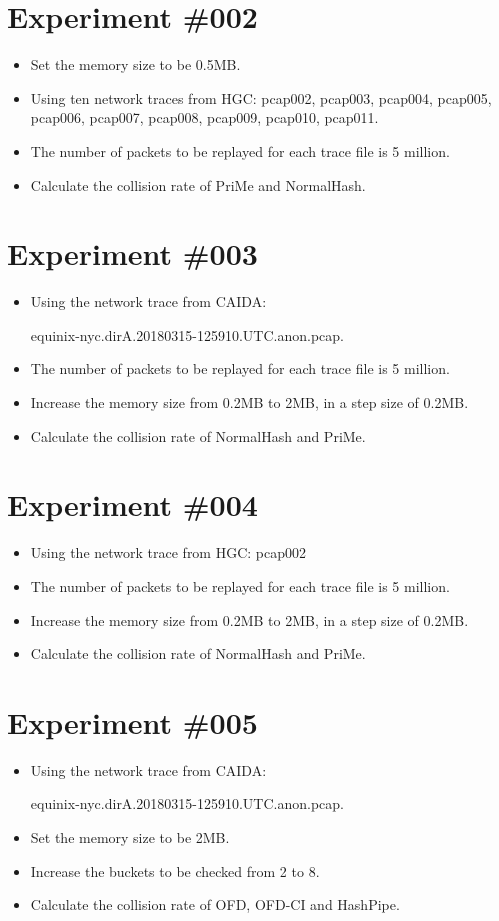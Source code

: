 \documentclass[10pt, conference, letterpaper]{IEEEtran}
\begin{document}
\section*{Experiment \#002}
\begin{itemize}
	\item Set the memory size to be 0.5MB.
	\item Using ten network traces from HGC: pcap002, pcap003, pcap004, pcap005, pcap006, pcap007, pcap008, pcap009, pcap010, pcap011.
	\item The number of packets to be replayed for each trace file is 5 million.
	\item Calculate the collision rate of PriMe and NormalHash.
\end{itemize}

\section*{Experiment \#003}
\begin{itemize}
	\item Using the network trace from CAIDA:

equinix-nyc.dirA.20180315-125910.UTC.anon.pcap.
	\item The number of packets to be replayed for each trace file is 5 million.
	\item Increase the memory size from 0.2MB to 2MB, in a step size of 0.2MB.
	\item Calculate the collision rate of NormalHash and PriMe.
\end{itemize}

\section*{Experiment \#004}
\begin{itemize}
	\item Using the network trace from HGC: pcap002
	\item The number of packets to be replayed for each trace file is 5 million.
	\item Increase the memory size from 0.2MB to 2MB, in a step size of 0.2MB.
	\item Calculate the collision rate of NormalHash and PriMe.
\end{itemize}

\section*{Experiment \#005}
\begin{itemize}
	\item Using the network trace from CAIDA:

equinix-nyc.dirA.20180315-125910.UTC.anon.pcap.
	\item Set the memory size to be 2MB.
	\item Increase the buckets to be checked from 2 to 8.
	\item Calculate the collision rate of OFD, OFD-CI and HashPipe.
\end{itemize}
\end{document}
